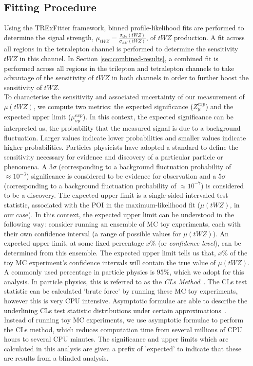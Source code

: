 \subsection{Fitting Procedure}
\label{sec:fitting-procedure}

Using the TRExFitter framework, binned profile-likelihood fits are performed to determine the signal strength, $\mu_{tWZ} = \frac{\sigma_{obs}(tWZ)}{\sigma_{SM}(tWZ)}$, of $tWZ$ production. A fit across all regions in the tetralepton channel is performed to determine the sensitivity $tWZ$ in this channel. In Section \ref{sec:combined-results}, a combined fit is performed across all regions in the trilepton and tetralepton channels to take advantage of the sensitivity of $tWZ$ in both channels in order to further boost the sensitivity of $tWZ$.\\

To characterise the sensitivity and associated uncertainty of our measurement of $\mu (tWZ)$, we compute two metrics: the expected significance ($Z_{\mu}^{exp}$) and the expected upper limit ($\mu_{up}^{exp}$). In this context, the expected significance can be interpreted as, the probability that the measured signal is due to a background fluctuation. Larger values indicate lower probabilities and smaller values indicate higher probabilities. Particles physicists have adopted a standard to define the sensitivity necessary for evidence and discovery of a particular particle or phenomena. A 3$\sigma$ (corresponding to a background fluctuation probability of $\approx 10^{-3}$) significance is considered to be evidence for observation and a 5$\sigma$ (corresponding to a background fluctuation probability of $\approx 10^{-7}$) is considered to be a discovery. The expected upper limit is a single-sided intervaled test statistic, associated with the POI in the maximum-likelihood fit ($\mu (tWZ)$, in our case). In this context, the expected upper limit can be understood in the following way: consider running an ensemble of MC toy experiments, each with their own confidence interval (a range of possible values for $\mu (tWZ)$). An expected upper limit, at some fixed percentage $x\%$ (or \textit{confidence level}), can be determined from this ensemble. The expected upper limit tells us that, $x\%$ of the toy MC experiment's confidence intervals will contain the true value of $\mu (tWZ)$. A commonly used percentage in particle physics is 95$\%$, which we adopt for this analysis. In particle physics, this is referred to as the \textit{CLs Method}~\cite{Cowan_2011}. The CLs test statistic can be calculated 'brute force' by running these MC toy experiments, however this is very CPU intensive. Asymptotic formulae are able to describe the underlining CLs test statistic distributions under certain approximations~\cite{asymptotic-formulae-slides}. Instead of running toy MC experiments, we use asymptotic formulae to perform the CLs method, which reduces computation time from several millions of CPU hours to several CPU minutes. The significance and upper limits which are calculated in this analysis are given a prefix of 'expected' to indicate that these are results from a blinded analysis. \\

